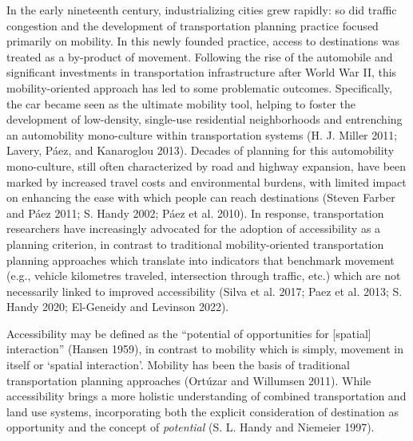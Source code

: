\documentclass[
]{article}
\begin{document}
In the early nineteenth century, industrializing cities grew rapidly: so
did traffic congestion and the development of transportation planning
practice focused primarily on mobility. In this newly founded practice,
access to destinations was treated as a by-product of movement.
Following the rise of the automobile and significant investments in
transportation infrastructure after World War II, this mobility-oriented
approach has led to some problematic outcomes. Specifically, the car
became seen as the ultimate mobility tool, helping to foster the
development of low-density, single-use residential neighborhoods and
entrenching an automobility mono-culture within transportation systems
(H. J. Miller 2011; Lavery, Páez, and Kanaroglou 2013). Decades of
planning for this automobility mono-culture, still often characterized
by road and highway expansion, have been marked by increased travel
costs and environmental burdens, with limited impact on enhancing the
ease with which people can reach destinations (Steven Farber and Páez
2011; S. Handy 2002; Páez et al. 2010). In response, transportation
researchers have increasingly advocated for the adoption of
accessibility as a planning criterion, in contrast to traditional
mobility-oriented transportation planning approaches which translate
into indicators that benchmark movement (e.g., vehicle kilometres
traveled, intersection through traffic, etc.) which are not necessarily
linked to improved accessibility (Silva et al. 2017; Paez et al. 2013;
S. Handy 2020; El-Geneidy and Levinson 2022).

Accessibility may be defined as the ``potential of opportunities for
{[}spatial{]} interaction'' (Hansen 1959), in contrast to mobility which
is simply, movement in itself or `spatial interaction'. Mobility has
been the basis of traditional transportation planning approaches
(Ortúzar and Willumsen 2011). While accessibility brings a more holistic
understanding of combined transportation and land use systems,
incorporating both the explicit consideration of destination as
opportunity and the concept of \emph{potential} (S. L. Handy and
Niemeier 1997).
\end{document}
